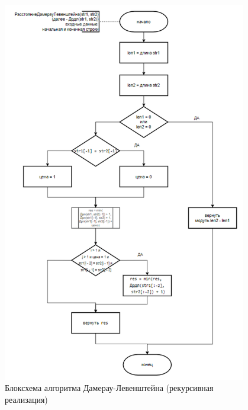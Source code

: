 \begin{figure}[H]
    \centering
    \includegraphics[width=0.95\textwidth]{img/block_2_2.png}
    \caption{Блоксхема алгоритма Дамерау-Левенштейна (рекурсивная реализация)}
\end{figure}

